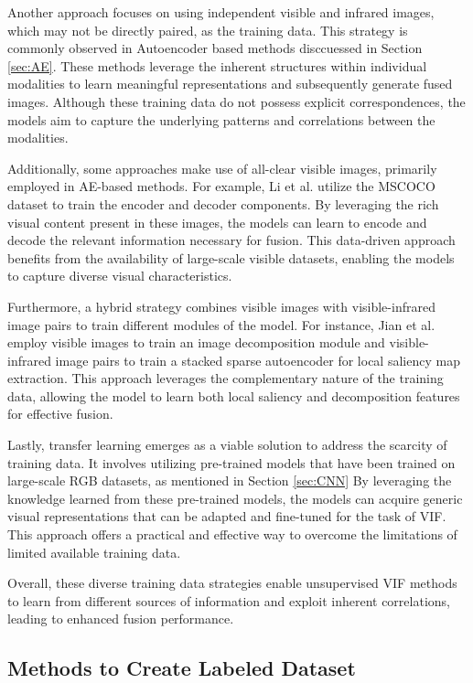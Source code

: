 Another approach focuses on using independent visible and infrared images, which may not be directly paired, as the training data. This strategy is commonly observed in Autoencoder based methods disccuessed in Section \ref{sec:AE}. These methods leverage the inherent structures within individual modalities to learn meaningful representations and subsequently generate fused images. Although these training data do not possess explicit correspondences, the models aim to capture the underlying patterns and correlations between the modalities.

Additionally, some approaches make use of all-clear visible images, primarily employed in AE-based methods. For example, Li et al. \cite{li2019infrared} utilize the MSCOCO dataset to train the encoder and decoder components. By leveraging the rich visual content present in these images, the models can learn to encode and decode the relevant information necessary for fusion. This data-driven approach benefits from the availability of large-scale visible datasets, enabling the models to capture diverse visual characteristics.

Furthermore, a hybrid strategy combines visible images with visible-infrared image pairs to train different modules of the model. For instance, Jian et al. \cite{jian2021infrared} employ visible images to train an image decomposition module and visible-infrared image pairs to train a stacked sparse autoencoder for local saliency map extraction. This approach leverages the complementary nature of the training data, allowing the model to learn both local saliency and decomposition features for effective fusion.

Lastly, transfer learning emerges as a viable solution to address the scarcity of training data. It involves utilizing pre-trained models that have been trained on large-scale RGB datasets, as mentioned in Section \ref{sec:CNN} By leveraging the knowledge learned from these pre-trained models, the models can acquire generic visual representations that can be adapted and fine-tuned for the task of VIF. This approach offers a practical and effective way to overcome the limitations of limited available training data.

Overall, these diverse training data strategies enable unsupervised VIF methods to learn from different sources of information and exploit inherent correlations, leading to enhanced fusion performance.

\subsection{Methods to Create Labeled Dataset}

